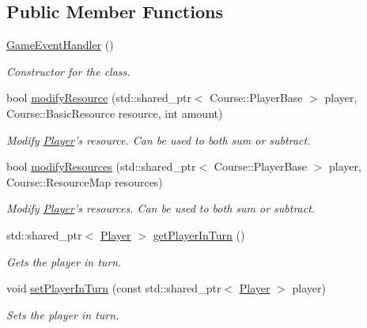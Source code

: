 \subsection*{Public Member Functions}
\begin{DoxyCompactItemize}
\item 
\hypertarget{classGameEventHandler_a5c739015e6a26976d4941581c7f4852f}{\hyperlink{classGameEventHandler_a5c739015e6a26976d4941581c7f4852f}{Game\-Event\-Handler} ()}\label{classGameEventHandler_a5c739015e6a26976d4941581c7f4852f}

\begin{DoxyCompactList}\small\item\em Constructor for the class. \end{DoxyCompactList}\item 
bool \hyperlink{classGameEventHandler_a7b0209a6043ba6626228c5340e9a7892}{modify\-Resource} (std\-::shared\-\_\-ptr$<$ Course\-::\-Player\-Base $>$ player, Course\-::\-Basic\-Resource resource, int amount)
\begin{DoxyCompactList}\small\item\em Modify \hyperlink{classPlayer}{Player}'s resource. Can be used to both sum or subtract. \end{DoxyCompactList}\item 
bool \hyperlink{classGameEventHandler_acae1377e4a362a488b67bb7c8767a94e}{modify\-Resources} (std\-::shared\-\_\-ptr$<$ Course\-::\-Player\-Base $>$ player, Course\-::\-Resource\-Map resources)
\begin{DoxyCompactList}\small\item\em Modify \hyperlink{classPlayer}{Player}'s resources. Can be used to both sum or subtract. \end{DoxyCompactList}\item 
std\-::shared\-\_\-ptr$<$ \hyperlink{classPlayer}{Player} $>$ \hyperlink{classGameEventHandler_abdea4b1e077b65b05451a9a8fe679831}{get\-Player\-In\-Turn} ()
\begin{DoxyCompactList}\small\item\em Gets the player in turn. \end{DoxyCompactList}\item 
void \hyperlink{classGameEventHandler_ab103e178471df2a5c6f5f769bd1e0459}{set\-Player\-In\-Turn} (const std\-::shared\-\_\-ptr$<$ \hyperlink{classPlayer}{Player} $>$ player)
\begin{DoxyCompactList}\small\item\em Sets the player in turn. \end{DoxyCompactList}\item 

\end{DoxyCompactItemize}
